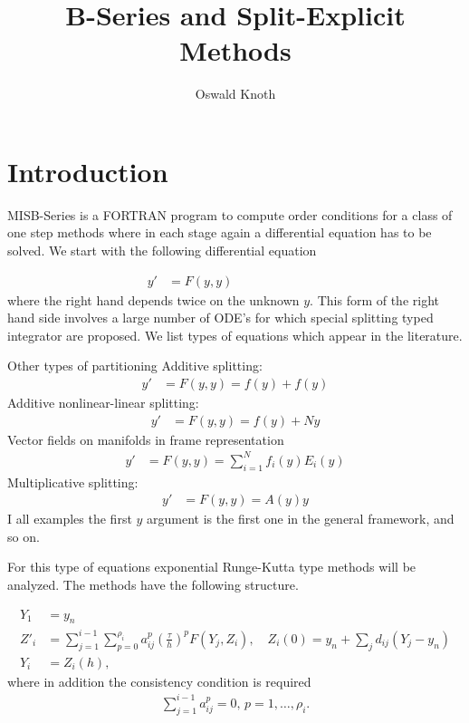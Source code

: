 \documentclass[english,unicode]{article}
\author{Oswald Knoth}
\title{B-Series and Split-Explicit Methods}
\def\Si{\sum_{j=1}^{i-1}a_{ij}^{[0]}}
\begin{document}


\section{Introduction}

MISB-Series is a FORTRAN program to compute order conditions for a class of one step methods where in each stage again a differential equation has to be solved. We start with the following differential equation

\begin{align*}
y' & = F(y,y) \hspace{3cm} 
\end{align*}
where the right hand depends twice on the unknown $y$. This form of the right hand side involves a large number of ODE's for which special splitting typed integrator are proposed. We list types of equations which appear in the literature.

Other types of partitioning 
Additive splitting:
\begin{align*}
y' & = F(y,y) =f(y)+f(y)
\end{align*}
Additive nonlinear-linear splitting:
\begin{align*}
y' & = F(y,y) = f(y)+Ny
\end{align*}
Vector fields on manifolds in frame representation
\begin{align*}
y' &=F (y,y)=\sum_{i=1}^Nf_i(y)E_i(y)
\end{align*}
Multiplicative splitting:
\begin{align*}
y' &=F (y,y)=A(y)y
\end{align*}
I all examples the first $y$ argument is the first one in the general framework, and so on. 

For this type of equations exponential Runge-Kutta type methods will be analyzed. The methods have the following structure.

\begin{align*}
Y_1 & = y_n\\
Z'_i &=\sum_{j=1}^{i-1}\sum_{p=0}^{\rho_i}a_{ij}^p\left(\frac{\tau}{h}\right)^p F(Y_j,Z_i),\quad Z_i(0)=y_n+\sum_jd_{ij}(Y_j-y_n)\\
Y_i &  =Z_i(h),
\end{align*}
where in addition the consistency condition is required
\begin{align*}
\sum_{j=1}^{i-1} a_{ij}^p=0,\, p=1,\ldots,\rho_i.
\end{align*}
\end{document}

